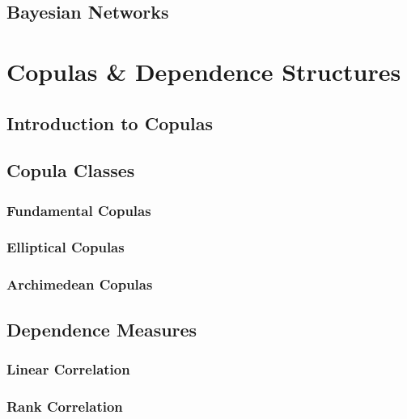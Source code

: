 \documentclass[11pt, twoside]{article}
\numberwithin{equation}{section}
\numberwithin{table}{section}
\numberwithin{figure}{section}
\begin{document}
\subsection{Bayesian Networks} \label{ssec:bayesian_networks}

\newpage

\thispagestyle{plain}
\section{Copulas \& Dependence Structures} \label{sec:copulas_and_dependence_structures}

\subsection{Introduction to Copulas} \label{ssec:intro_to_copulas}

\subsection{Copula Classes} \label{ssec:copula_classes}

\subsubsection{Fundamental Copulas} \label{sssec:fundamental_copulas}

\subsubsection{Elliptical Copulas} \label{sssec:elliptical_copulas}

\subsubsection{Archimedean Copulas} \label{sssec:archimedean_copulas}

\subsection{Dependence Measures} \label{ssec:dependence_measures}

\subsubsection{Linear Correlation} \label{sssec:linear_correlation}

\subsubsection{Rank Correlation} \label{sssec:rank_correlation}

\end{document}
